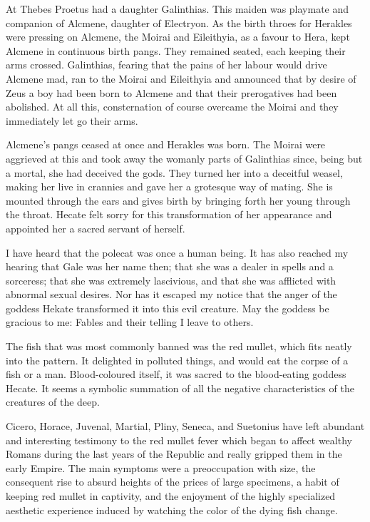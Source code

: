 \begin{tcolorbox}[breakable, colback=white, colframe=black!80,
  boxrule=0.6pt, arc=0mm, left=3mm, right=3mm, top=2mm, bottom=2mm]
\ttfamily\small\raggedright
At Thebes Proetus had a daughter Galinthias. This maiden was playmate and companion of Alcmene, daughter of Electryon. As the birth throes for Herakles were pressing on Alcmene, the Moirai and Eileithyia, as a favour to Hera, kept Alcmene in continuous birth pangs. They remained seated, each keeping their arms crossed. Galinthias, fearing that the pains of her labour would drive Alcmene mad, ran to the Moirai and Eileithyia and announced that by desire of Zeus a boy had been born to Alcmene and that their prerogatives had been abolished. At all this, consternation of course overcame the Moirai and they immediately let go their arms.\par
\medskip
Alcmene’s pangs ceased at once and Herakles was born. The Moirai were aggrieved at this and took away the womanly parts of Galinthias since, being but a mortal, she had deceived the gods. They turned her into a deceitful weasel, making her live in crannies and gave her a grotesque way of mating. She is mounted through the ears and gives birth by bringing forth her young through the throat. Hecate felt sorry for this transformation of her appearance and appointed her a sacred servant of herself.\par
\medskip
I have heard that the polecat was once a human being. It has also reached my hearing that Gale was her name then; that she was a dealer in spells and a sorceress; that she was extremely lascivious, and that she was afflicted with abnormal sexual desires. Nor has it escaped my notice that the anger of the goddess Hekate transformed it into this evil creature. May the goddess be gracious to me: Fables and their telling I leave to others.\par
\medskip
The fish that was most commonly banned was the red mullet, which fits neatly into the pattern. It \textquotesingle{}delighted in polluted things\textquotesingle{}, and \textquotesingle{}would eat the corpse of a fish or a man\textquotesingle{}. Blood-{}coloured itself, it was sacred to the blood-{}eating goddess Hecate. It seems a symbolic summation of all the negative characteristics of the creatures of the deep.\par
\medskip
Cicero, Horace, Juvenal, Martial, Pliny, Seneca, and Suetonius have left abundant and interesting testimony to the red mullet fever which began to affect wealthy Romans during the last years of the Republic and really gripped them in the early Empire. The main symptoms were a preoccupation with size, the consequent rise to absurd heights of the prices of large specimens, a habit of keeping red mullet in captivity, and the enjoyment of the highly specialized aesthetic experience induced by watching the color of the dying fish change.\par

\end{tcolorbox}
